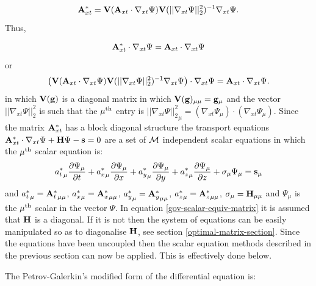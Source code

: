 \begin{equation}
 {\bf A}_{xt}^* = {{\bf V}({\bf A}_{xt}\cdot{\nabla_{xt}} \Psi)}
 {\bf V}({\vert\vert{\nabla_{xt}} \Psi\vert\vert^2_2})^{-1} {\nabla_{xt}} \Psi.
\label{a*-def-matrix}
\end{equation}
 Thus,

\begin{equation}
 {\bf A}_{xt}^* \cdot {\nabla_{xt}} \Psi = {\bf A}_{xt} \cdot {\nabla_{xt}} \Psi
\label{a*-equiv-matrix}
\end{equation}
 or
\begin{equation}
 \left({{\bf V}({\bf A}_{xt}\cdot{\nabla_{xt}} \Psi)}
 {\bf V}({\vert\vert{\nabla_{xt}} \Psi\vert\vert^2_2})^{-1} {\nabla_{xt}} \Psi
    \right) \cdot {\nabla_{xt}} \Psi = {\bf A}_{xt} \cdot {\nabla_{xt}} \Psi .
\label{equiv-matrix}
\end{equation}
in which ${\bf V}({\bf g})$ is a diagonal matrix
in which ${\bf V}({\bf g})_{\mu\mu}={\bf g}_\mu$ and the vector
$\vert\vert{\nabla_{xt}} \Psi\vert\vert^2_2$ is such that the $\mu^{\rm th}$
entry is ${\vert\vert{\nabla_{xt}} \Psi\vert\vert^2_2}_\mu = (\nabla_{xt} \Psi_\mu)\cdot (\nabla_{xt} \Psi_\mu)$.
Since the matrix ${\bf A}_{xt}^*$ has a block diagonal structure
the transport equations
${\bf A}_{xt}^*\cdot{\nabla_{xt}} \Psi+{\bf H}\Psi -{\bf s}=0$
are a set of ${\cal M}$ independent scalar equations
in which the $\mu^{\rm th}$ scalar equation is:
\begin{equation}
{a^*_t}_\mu \frac{\partial \Psi_\mu}{\partial t} +
{a^*_x}_\mu \frac{\partial \Psi_\mu}{\partial x} +
{a^*_y}_\mu \frac{\partial \Psi_\mu}{\partial y} +
{a^*_z}_\mu \frac{\partial \Psi_\mu}{\partial z} +
\sigma_\mu \Psi_\mu
={\bf s}_\mu
\label{gov-scalar-equiv-matrix}
\end{equation}
and
${a^*_t}_\mu={{\bf A}^*_t}_{\mu\mu}$,
${a^*_x}_\mu={{\bf A}^*_x}_{\mu\mu}$,
${a^*_y}_\mu={{\bf A}^*_y}_{\mu\mu}$,
${a^*_z}_\mu={{\bf A}^*_z}_{\mu\mu}$,
$\sigma_\mu={\bf H}_{\mu\mu}$ and $\Psi_\mu$ is the $\mu^{\rm th}$ scalar
in the vector $\Psi$. In equation \ref{gov-scalar-equiv-matrix} it is
assumed that ${\bf H}$ is a diagonal. If it is not then the system of
equations can be easily manipulated so as to diagonalise ${\bf H}$, see
section \ref{optimal-matrix-section}. Since the equations have been
uncoupled then the scalar equation methods described in the
previous section can now be applied. This is effectively done below.

 The Petrov-Galerkin's modified form of the
 differential equation is:

